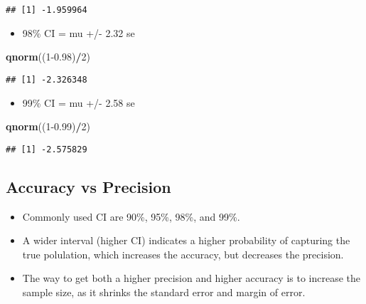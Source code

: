 \documentclass[]{book}
\newenvironment{Shaded}{\begin{snugshade}}{\end{snugshade}}
\newcommand{\DecValTok}[1]{\textcolor[rgb]{0.00,0.00,0.81}{#1}}
\newcommand{\FloatTok}[1]{\textcolor[rgb]{0.00,0.00,0.81}{#1}}
\newcommand{\KeywordTok}[1]{\textcolor[rgb]{0.13,0.29,0.53}{\textbf{#1}}}
\newcommand{\NormalTok}[1]{#1}
\newcommand{\OperatorTok}[1]{\textcolor[rgb]{0.81,0.36,0.00}{\textbf{#1}}}
\providecommand{\tightlist}{%
  \setlength{\itemsep}{0pt}\setlength{\parskip}{0pt}}
\begin{document}
\begin{verbatim}
## [1] -1.959964
\end{verbatim}

\begin{itemize}
\tightlist
\item
  98\% CI = mu +/- 2.32 se
\end{itemize}

\begin{Shaded}
\begin{Highlighting}[]
\KeywordTok{qnorm}\NormalTok{((}\DecValTok{1}\FloatTok{-0.98}\NormalTok{)}\OperatorTok{/}\DecValTok{2}\NormalTok{)}
\end{Highlighting}
\end{Shaded}

\begin{verbatim}
## [1] -2.326348
\end{verbatim}

\begin{itemize}
\tightlist
\item
  99\% CI = mu +/- 2.58 se
\end{itemize}

\begin{Shaded}
\begin{Highlighting}[]
\KeywordTok{qnorm}\NormalTok{((}\DecValTok{1}\FloatTok{-0.99}\NormalTok{)}\OperatorTok{/}\DecValTok{2}\NormalTok{)}
\end{Highlighting}
\end{Shaded}

\begin{verbatim}
## [1] -2.575829
\end{verbatim}

\hypertarget{accuracy-vs-precision}{%
\subsection*{Accuracy vs Precision}\label{accuracy-vs-precision}}

\begin{itemize}
\tightlist
\item
  Commonly used CI are 90\%, 95\%, 98\%, and 99\%.
\item
  A wider interval (higher CI) indicates a higher probability of capturing the true polulation, which increases the accuracy, but decreases the precision.
\item
  The way to get both a higher precision and higher accuracy is to increase the sample size, as it shrinks the standard error and margin of error.
\end{itemize}
\end{document}
